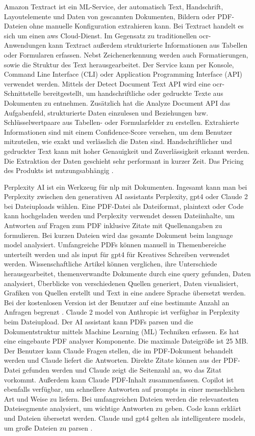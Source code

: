 Amazon Textract ist ein ML-Service, der automatisch Text, Handschrift, Layoutelemente und Daten von gescannten Dokumenten, Bildern oder PDF-Dateien ohne manuelle Konfiguration extrahieren kann. Bei Textract handelt es sich um einen \gls{aws} Cloud-Dienst. Im Gegensatz zu traditionellen \gls{ocr}-Anwendungen kann Textract außerdem strukturierte Informationen aus Tabellen oder Formularen erfassen. Nebst Zeichenerkennung werden auch Formatierungen, sowie die Struktur des Text herausgearbeitet. Der Service kann per Konsole, Command Line Interface (CLI) oder Application Programming Interface (API) verwendet werden. Mittels der Detect Document Text API wird eine \gls{ocr}-Schnittstelle bereitgestellt, um handschriftliche oder gedruckte Texte aus Dokumenten zu entnehmen. Zusätzlich hat die Analyze Document API das Aufgabenfeld, strukturierte Daten einzulesen und Beziehungen bzw. Schlüsselwertpaare aus Tabellen- oder Formularfelder zu erstellen. Extrahierte Informationen sind mit einem Confidence-Score versehen, um dem Benutzer mitzuteilen, wie exakt und verlässlich die Daten sind. Handschriftlicher und gedruckter Text kann mit hoher Genauigkeit und Zuverlässigkeit erkannt werden. Die Extraktion der Daten geschieht sehr performant in kurzer Zeit. Das Pricing des Produkts ist nutzungsabhängig \cite{textract}.


Perplexity AI ist ein Werkzeug für \gls{nlp} mit Dokumenten. Ingesamt kann man bei Perplexity zwischen den generativen AI assistants Perplexity, \gls{gpt4} oder Claude 2 bei Dateiuploads wählen. Eine PDF-Datei als Dateiformat, plaintext oder Code kann hochgeladen werden und Perplexity verwendet dessen Dateiinhalte, um Antworten auf Fragen zum PDF inklusive Zitate mit Quellenangaben zu formulieren. Bei kurzen Dateien wird das gesamte Dokument beim language model analysiert. Umfangreiche PDFs können manuell in Themenbereiche unterteilt werden und als input für \gls{gpt4} für Kreatives Schreiben verwendet werden. Wissenschaftliche Artikel können verglichen, ihre Unterschiede herausgearbeitet, themenverwandte Dokumente durch eine query gefunden, Daten analysiert, Überblicke von verschiedenen Quellen generiert, Daten visualisiert, Grafiken von Quellen erstellt und Text in eine andere Sprache übersetzt werden. Bei der kostenlosen Version ist der Benutzer auf eine bestimmte Anzahl an Anfragen begrenzt \cite{hackernoon-claude}. Claude 2 model von Anthropic ist verfügbar in Perplexity beim Dateiupload. Der AI assistant kann PDFs parsen und die Dokumentstruktur mittels Machine Learning (ML) Techniken erfassen. Es hat eine eingebaute PDF analyser Komponente. Die maximale Dateigröße ist 25 MB. Der Benutzer kann Claude Fragen stellen, die im PDF-Dokument behandelt werden und Claude liefert die Antworten. Direkte Zitate können aus der PDF-Datei gefunden werden und Claude zeigt die Seitenzahl an, wo das Zitat vorkommt. Außerdem kann Claude PDF-Inhalt zusammenfassen. Copilot ist ebenfalls verfügbar, um schnellere Antworten auf prompts in einer menschlichen Art und Weise zu liefern. Bei umfangreichen Dateien werden die relevantesten Dateisegmente analysiert, um wichtige Antworten zu geben. Code kann erklärt und Dateien übersetzt werden. Claude und \gls{gpt4} gelten als intelligentere models, um große Dateien zu parsen \cite{perplexity}.

